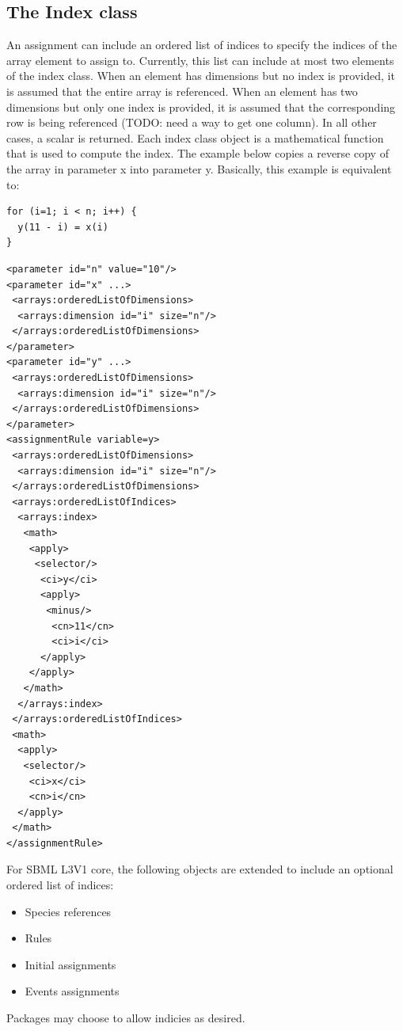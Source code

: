 \subsection{The Index class}

An assignment can include an ordered list of indices to specify the indices of the array element to assign to.  Currently, this list can include at most two elements of the index class.  When an element has dimensions but no index is provided, it is assumed that the entire array is referenced.  When an element has two dimensions but only one index is provided, it is assumed that the corresponding row is being referenced (TODO: need a way to get one column).  In all other cases, a scalar is returned.  Each index class object is a mathematical function that is used to compute the index.  The example below copies a reverse copy of the array in parameter x into parameter y.  Basically, this example is equivalent to:
\begin{verbatim}
for (i=1; i < n; i++) {
  y(11 - i) = x(i)
}
\end{verbatim}

\begin{verbatim} 
<parameter id="n" value="10"/>
<parameter id="x" ...>
 <arrays:orderedListOfDimensions>
  <arrays:dimension id="i" size="n"/>
 </arrays:orderedListOfDimensions>
</parameter>
<parameter id="y" ...>
 <arrays:orderedListOfDimensions>
  <arrays:dimension id="i" size="n"/>
 </arrays:orderedListOfDimensions>
</parameter>
<assignmentRule variable=y>
 <arrays:orderedListOfDimensions>
  <arrays:dimension id="i" size="n"/>
 </arrays:orderedListOfDimensions>
 <arrays:orderedListOfIndices>
  <arrays:index>
   <math>
    <apply>
     <selector/>
      <ci>y</ci>
      <apply>
       <minus/>
        <cn>11</cn>
        <ci>i</ci>
      </apply>
    </apply>
   </math>
  </arrays:index>
 </arrays:orderedListOfIndices>
 <math>
  <apply>
   <selector/>
    <ci>x</ci>
    <cn>i</cn>
  </apply>
 </math> 
</assignmentRule>
\end{verbatim}

For SBML L3V1 core, the following objects are extended to include an optional ordered list of indices:
\begin{itemize}
\item Species references
\item Rules
\item Initial assignments
\item Events assignments
\end{itemize}
Packages may choose to allow indicies as desired.  

